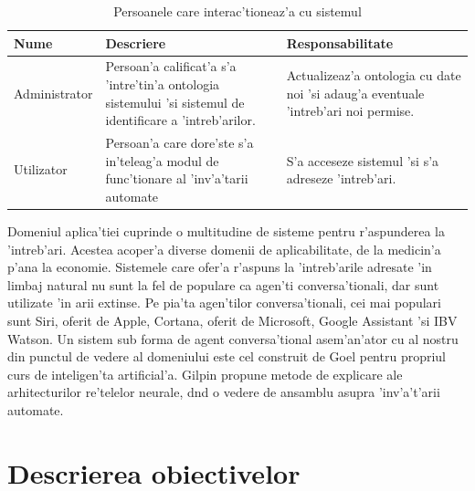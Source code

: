 \documentclass[12pt,a4paper,twoside]{report}
\begin{document}
\begin{table}
    \centering
    \begin{tabular}{p{2.5cm}|p{5cm}|p{4.5cm}}
    Nume & Descriere & Responsabilitate \\
    \hline
Administrator & Persoan'a calificat'a s'a 'intre'tin'a ontologia sistemului 'si sistemul de identificare a 'intreb'arilor.  & Actualizeaz'a ontologia cu date noi 'si adaug'a eventuale 'intreb'ari noi permise.\\[1ex]
    \hline
Utilizator & Persoan'a care dore'ste s'a in'teleag'a modul de func'tionare  al 'inv'a'tarii automate & S'a acceseze sistemul 'si s'a adreseze 'intreb'ari.\\[1ex]
    \end{tabular}
     \caption{Persoanele care interac'tioneaz'a cu sistemul}
    \label{tab:stakeholders}
\end{table}

Domeniul aplica'tiei cuprinde o multitudine de sisteme pentru r'aspunderea la 'intreb'ari. Acestea acoper'a diverse domenii de aplicabilitate, de la medicin'a p'ana la economie. Sistemele care ofer'a r'aspuns la 'intreb'arile adresate 'in limbaj natural nu sunt la fel de populare ca agen'ti conversa'tionali, dar sunt utilizate 'in arii extinse. Pe pia'ta agen'tilor conversa'tionali, cei mai populari sunt Siri, oferit de Apple, Cortana, oferit de Microsoft, Google Assistant 'si IBV Watson. Un sistem sub forma de agent conversa'tional asem'an'ator cu al nostru din punctul de vedere al domeniului este cel construit de Goel \cite{WatsonAEducation} pentru propriul curs de inteligen'ta artificial'a. Gilpin \cite{Gilpin2019ExplainingLearning} propune metode de explicare ale arhitecturilor re'telelor neurale, d\ia nd o vedere de ansamblu asupra 'inv'a't'arii automate.

\section{Descrierea obiectivelor}
\end{document}
